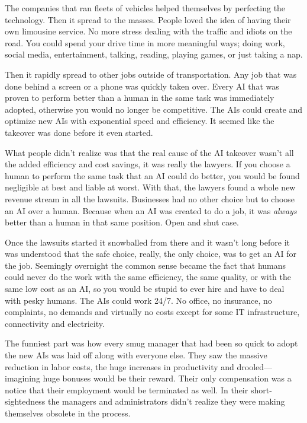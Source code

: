 The companies that ran fleets of vehicles helped themselves by
perfecting the technology. Then it spread to the masses. People
loved the idea of having their own limousine service. No more
stress dealing with the traffic and idiots on the road. You
could spend your drive time in more meaningful ways; doing work,
social media, entertainment, talking, reading, playing games, or
just taking a nap.

Then it rapidly spread to other jobs outside of transportation.
Any job that was done behind a screen or a phone was quickly
taken over.  Every AI that was proven to perform better than a
human in the same task was immediately adopted, otherwise you
would no longer be competitive. The AIs could create and
optimize new AIs with exponential speed and efficiency. It
seemed like the takeover was done before it even started.

What people didn't realize was that the real cause of the AI
takeover wasn't all the added efficiency and cost savings, it
was really the lawyers.  If you choose a human to perform the
same task that an AI could do better, you would be found
negligible at best and liable at worst. With that, the lawyers
found a whole new revenue stream in all the lawsuits.
Businesses had no other choice but to choose an AI over a human.
Because when an AI was created to do a job, it was \emph{always}
better than a human in that same position. Open and shut case.

Once the lawsuits started it snowballed from there and it wasn't
long before it was understood that the safe choice, really, the
only choice, was to get an AI for the job.  Seemingly overnight
the common sense became the fact that humans could never do the
work with the same efficiency, the same quality, or with the
same low cost as an AI, so you would be stupid to ever hire and
have to deal with pesky humans. The AIs could work 24/7. No
office, no insurance, no complaints, no demands and virtually no
costs except for some IT infrastructure, connectivity and
electricity.

The funniest part was how every smug manager that had been so
quick to adopt the new AIs was laid off along with everyone
else. They saw the massive reduction in labor costs, the huge
increases in productivity and drooled---imagining huge bonuses
would be their reward.  Their only compensation was a notice that
their employment would be terminated as well.  In their
short-sightedness the managers and administrators didn't realize
they were making themselves obsolete in the process.

